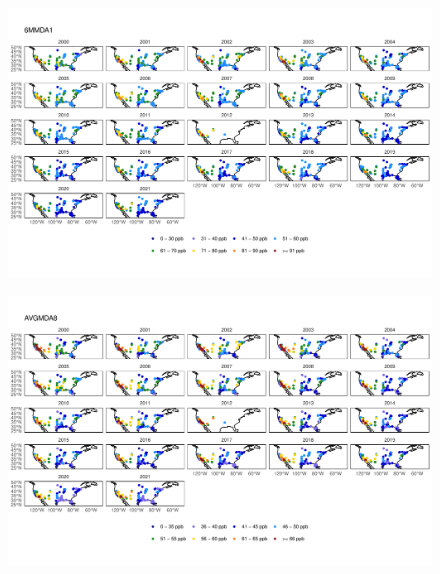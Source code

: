 \documentclass{article}
\begin{document}
\begin{figure}
\centering
\includegraphics[height=0.75\textheight]{figures/si_figures/fS19_metric_map_United-States-of-America_6MMDA1.pdf}
\caption{}
\label{si_fig:metric_map_us_6MMDA1}
\end{figure}
\clearpage

\begin{figure}
\centering
\includegraphics[height=0.75\textheight]{figures/si_figures/fS20_metric_map_United-States-of-America_AVGMDA8.pdf}
\caption{}
\label{si_fig:metric_map_us_AVGMDA8}
\end{figure}
\clearpage


\end{document}
